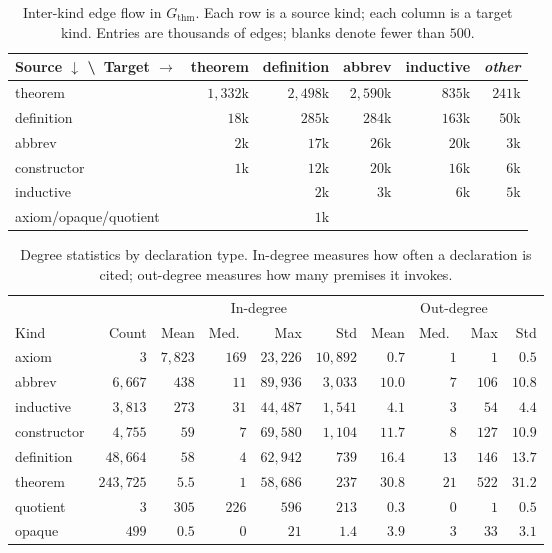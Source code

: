 \begin{table}[H]
\centering
\caption{Inter-kind edge flow in $G_{\mathrm{thm}}$. Each row is a source kind; each column is a target kind. Entries are thousands of edges; blanks denote fewer than $500$.}
\label{tab:inter-kind-flow}
\small
\begin{tabular}{l*{5}{r}}
\toprule
Source $\downarrow$ \textbackslash\ Target $\rightarrow$ & theorem & definition & abbrev & inductive & \textit{other} \\
\midrule
theorem      & $1{,}332$k & $2{,}498$k & $2{,}590$k & $835$k & $241$k \\
definition   & $18$k      & $285$k     & $284$k     & $163$k & $50$k \\
abbrev       & $2$k       & $17$k      & $26$k      & $20$k  & $3$k \\
constructor  & $1$k       & $12$k      & $20$k      & $16$k  & $6$k \\
inductive    &            & $2$k       & $3$k       & $6$k   & $5$k \\
axiom/opaque/quotient &   & $1$k       &            &        & \\
\bottomrule
\end{tabular}
\end{table}

\begin{table}[ht]
\centering
\caption{Degree statistics by declaration type. In-degree measures how often a declaration is cited; out-degree measures how many premises it invokes.}
\label{tab:thm-kind-degree}
\small
\begin{tabular}{lrrrrrrrrr}
\toprule
& & \multicolumn{4}{c}{In-degree} & \multicolumn{4}{c}{Out-degree} \\
\cmidrule(lr){3-6} \cmidrule(lr){7-10}
Kind & Count & Mean & Med.\ & Max & Std & Mean & Med.\ & Max & Std \\
\midrule
axiom       & $3$       & $7{,}823$ & $169$ & $23{,}226$ & $10{,}892$ & $0.7$ & $1$ & $1$ & $0.5$ \\
abbrev      & $6{,}667$ & $438$     & $11$  & $89{,}936$ & $3{,}033$  & $10.0$ & $7$ & $106$ & $10.8$ \\
inductive   & $3{,}813$ & $273$     & $31$  & $44{,}487$ & $1{,}541$  & $4.1$ & $3$ & $54$ & $4.4$ \\
constructor & $4{,}755$ & $59$      & $7$   & $69{,}580$ & $1{,}104$  & $11.7$ & $8$ & $127$ & $10.9$ \\
definition  & $48{,}664$& $58$      & $4$   & $62{,}942$ & $739$      & $16.4$ & $13$ & $146$ & $13.7$ \\
theorem     & $243{,}725$& $5.5$   & $1$   & $58{,}686$ & $237$      & $30.8$ & $21$ & $522$ & $31.2$ \\
quotient    & $3$       & $305$     & $226$ & $596$      & $213$      & $0.3$ & $0$ & $1$ & $0.5$ \\
opaque      & $499$     & $0.5$     & $0$   & $21$       & $1.4$      & $3.9$ & $3$ & $33$ & $3.1$ \\
\bottomrule
\end{tabular}
\end{table}

